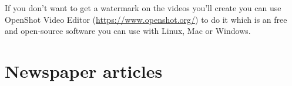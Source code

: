\documentclass[12pt,oneside]{report}
\begin{document}
\begin{spacing}{1.2}
If you don't want to get a watermark on the videos you'll create you can use OpenShot Video Editor (\url{https://www.openshot.org/}) to do it which is an free and open-source software you can use with Linux, Mac or Windows.
\color{black}


\section{Newspaper articles}





\end{spacing}
\end{document}
